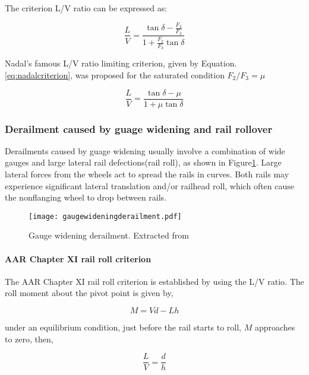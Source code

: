 The criterion L/V ratio can be expressed as:

\begin{equation}
    \frac{L}{V}=\frac{\tan \delta -\frac{F_2}{F_3}}{1+\frac{F_2}{F_3}\tan \delta}
\end{equation}

Nadal's famous L/V ratio limiting criterion, given by Equation.\ref{eq:nadalcriterion}, was proposed for the saturated condition $F_2/F_3=\mu$

\begin{equation}\label{eq:nadalcriterion}
    \frac{L}{V}=\frac{\tan \delta - \mu}{1+ \mu \tan \delta}
\end{equation}

\subsubsection{Derailment caused by guage widening and rail rollover}
Derailments caused by guage widening usually involve a combination of wide gauges and large lateral rail defections(rail roll), as shown in Figure\ref{fig:gaugewideningderailment}. Large lateral forces from the wheels act to spread the rails in curves. Both rails may experience significant lateral translation and/or railhead roll, which often cause the nonflanging wheel to drop between rails.

\begin{figure}[h]
    \centering
    \texttt{[image: gaugewideningderailment.pdf]}
    \caption{Gauge widening derailment. Extracted from \cite[Figure8.18]{iwnicki2006handbook}}
    \label{fig:gaugewideningderailment}
\end{figure}

\paragraph{AAR Chapter XI rail roll criterion}
The AAR Chapter XI rail roll criterion is established by using the L/V ratio. The roll moment about the pivot point is given by,

\begin{equation}
    M=Vd-Lh
\end{equation}

under an equilibrium condition, just before the rail starts to roll, $M$ approaches to zero, then,

\begin{equation}
    \frac{L}{V}=\frac{d}{h}
\end{equation}

